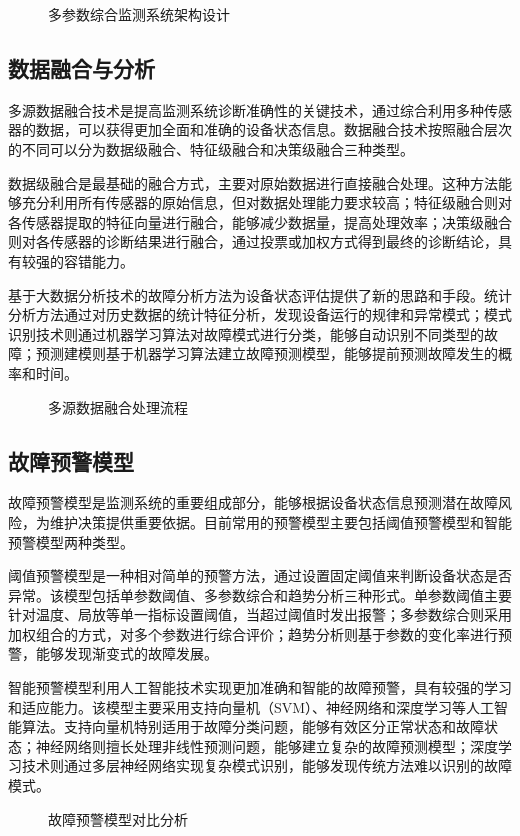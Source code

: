 \begin{figure}[h]
\centering
\caption{多参数综合监测系统架构设计}
\label{fig:system_architecture}
\end{figure}

\subsection{数据融合与分析}

多源数据融合技术是提高监测系统诊断准确性的关键技术，通过综合利用多种传感器的数据，可以获得更加全面和准确的设备状态信息。数据融合技术按照融合层次的不同可以分为数据级融合、特征级融合和决策级融合三种类型。

数据级融合是最基础的融合方式，主要对原始数据进行直接融合处理。这种方法能够充分利用所有传感器的原始信息，但对数据处理能力要求较高；特征级融合则对各传感器提取的特征向量进行融合，能够减少数据量，提高处理效率；决策级融合则对各传感器的诊断结果进行融合，通过投票或加权方式得到最终的诊断结论，具有较强的容错能力。

基于大数据分析技术的故障分析方法为设备状态评估提供了新的思路和手段。统计分析方法通过对历史数据的统计特征分析，发现设备运行的规律和异常模式；模式识别技术则通过机器学习算法对故障模式进行分类，能够自动识别不同类型的故障；预测建模则基于机器学习算法建立故障预测模型，能够提前预测故障发生的概率和时间。

\begin{figure}[h]
\centering
\caption{多源数据融合处理流程}
\label{fig:data_fusion_process}
\end{figure}

\subsection{故障预警模型}

故障预警模型是监测系统的重要组成部分，能够根据设备状态信息预测潜在故障风险，为维护决策提供重要依据。目前常用的预警模型主要包括阈值预警模型和智能预警模型两种类型。

阈值预警模型是一种相对简单的预警方法，通过设置固定阈值来判断设备状态是否异常。该模型包括单参数阈值、多参数综合和趋势分析三种形式。单参数阈值主要针对温度、局放等单一指标设置阈值，当超过阈值时发出报警；多参数综合则采用加权组合的方式，对多个参数进行综合评价；趋势分析则基于参数的变化率进行预警，能够发现渐变式的故障发展。

智能预警模型利用人工智能技术实现更加准确和智能的故障预警，具有较强的学习和适应能力。该模型主要采用支持向量机（SVM）、神经网络和深度学习等人工智能算法。支持向量机特别适用于故障分类问题，能够有效区分正常状态和故障状态；神经网络则擅长处理非线性预测问题，能够建立复杂的故障预测模型；深度学习技术则通过多层神经网络实现复杂模式识别，能够发现传统方法难以识别的故障模式。

\begin{figure}[h]
\centering
\caption{故障预警模型对比分析}
\label{fig:warning_model_comparison}
\end{figure}
